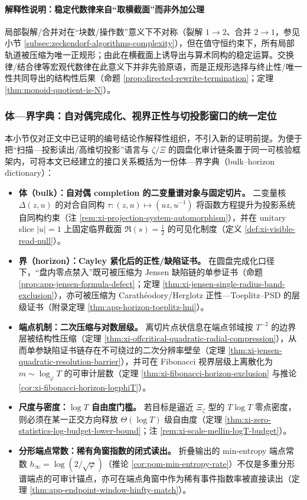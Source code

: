 \paragraph{解释性说明：稳定代数律来自“取横截面”而非外加公理}
局部裂解/合并对在“块数/操作数”意义下不对称（裂解 \(1\to 2\)、合并 \(2\to 1\)，参见小节 \ref{subsec:zeckendorf-algorithms-complexity}），但在值守恒约束下，所有局部轨道被压缩为唯一正规形；由此在横截面上诱导出与算术同构的稳定运算。交换律/结合律等宏观代数律在此意义下并非先验原语，而是正规形选择与终止性/唯一性共同导出的结构性后果（命题 \ref{prop:directed-rewrite-termination}；定理 \ref{thm:monoid-quotient-is-N}）。

\subsubsection{体—界字典：自对偶完成化、视界正性与切投影窗口的统一定位}\label{subsubsec:discussion-bulk-horizon-dictionary}
本小节仅对正文中已证明的编号结论作解释性组织，不引入新的证明前提。为便于把“扫描—投影读出/高维切投影”语言与 \(\zeta/\Xi\) 的圆盘化审计链条置于同一可核验框架内，可将本文已经建立的接口关系概括为一份体—界字典（bulk–horizon dictionary）：
\begin{itemize}
  \item \textbf{体（bulk）：自对偶 completion 的二变量谱对象与固定切片。}
  二变量核 \(\Delta(z,u)\) 的对合自同构 \(\tau:(z,u)\mapsto(uz,u^{-1})\) 将函数方程提升为投影系统自同构约束（注 \ref{rem:xi-projection-system-automorphism}），并在 unitary slice \(|u|=1\) 上固定临界截面 \(\Re(s)=\tfrac12\) 的可见化制度（定义 \ref{def:xi-visible-read-null}）。
  \item \textbf{界（horizon）：Cayley 紧化后的正性/缺陷证书。}
  在圆盘完成化口径下，“盘内零点禁入”既可被压缩为 Jensen 缺陷链的单参证书（命题 \ref{prop:app-jensen-formula-defect}；定理 \ref{thm:xi-jensen-single-radius-band-exclusion}），亦可被压缩为 Carath\'eodory/Herglotz 正性—Toeplitz--PSD 的层级证书（附录定理 \ref{thm:app-horizon-toeplitz-lmi}）。
  \item \textbf{端点机制：二次压缩与对数层级。}
  离切片点状信息在端点邻域按 \(T^{-2}\) 的边界层被结构性压缩（定理 \ref{thm:xi-offcritical-quadratic-radial-compression}），从而单参缺陷证书链存在不可绕过的二次分辨率壁垒（定理 \ref{thm:xi-jensen-quadratic-resolution-barrier}），并可在 Fibonacci 视界层级上离散化为 \(m\sim\log_\varphi T\) 的可审计层数（定理 \ref{thm:xi-fibonacci-horizon-exclusion} 与推论 \ref{cor:xi-fibonacci-horizon-logphiT}）。
  \item \textbf{尺度与密度：\texorpdfstring{$\log T$}{log T} 自由度门槛。}
  若目标是逼近 \(\Xi_\zeta\) 型的 \(T\log T\) 零点密度，则必须在某一正交方向释放 \(\Theta(\log T)\) 级自由度（定理 \ref{thm:xi-zero-statistics-log-budget-lower-bound}；注 \ref{rem:xi-scale-mellin-logT-budget}）。
  \item \textbf{分形端点常数：稀有角窗指数的闭式读出。}
  折叠输出的 min-entropy 端点常数 \(h_\infty=\log(2/\sqrt\varphi)\)（推论 \ref{cor:pom-min-entropy-rate}）不仅是多重分形谱端点的可审计锚点，亦可在端点角窗中作为稀有事件指数率被直接读出（定理 \ref{thm:app-endpoint-window-hinfty-match}）。
\end{itemize}
